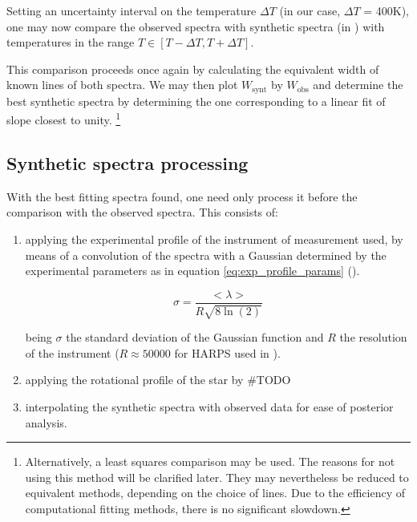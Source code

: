 \documentclass{aa}
\begin{document}
Setting an uncertainty interval on the temperature $\Delta T$  (in our case,
$\Delta T$ = 400K), one may now compare the observed spectra with synthetic
spectra (in \cite{laverny_ambre_2012}) with temperatures in the range $T\in [T - \Delta T, T + \Delta T]$.

This comparison proceeds once again by calculating the equivalent width of known
lines of both spectra. We may then plot $W_\text{synt}$ by $W_\text{obs}$ and
determine the best synthetic spectra by determining the one
corresponding to a linear fit of slope closest to unity. \footnote{Alternatively, a least squares
  comparison may be used. The reasons for not using this method will be
  clarified later. They may nevertheless be reduced to equivalent methods,
  depending on the choice of lines. Due to the efficiency of computational
  fitting methods, there is no significant slowdown.}


\subsection{Synthetic spectra processing}

With the best fitting spectra found, one need only process it before the comparison
with the observed spectra. This consists of:

\begin{enumerate}
\item applying the experimental profile of
  the instrument of measurement used, by means of a convolution of the spectra
  with a Gaussian determined by the experimental parameters as in equation
  \ref{eq:exp_profile_params} (\cite{monteiro_sebenta_2019}).

  \begin{equation}
    \label{eq:exp_profile_params}
    \sigma = \frac{<\lambda>}{R \sqrt{8 \ln (2)}}
  \end{equation}

  being $\sigma$ the standard deviation of the Gaussian function and $R$ the
  resolution of the instrument ($R \approx 50000$ for HARPS used in \cite{tsantaki_deriving_2013}).

\item applying the rotational profile of the star by \#TODO
\item interpolating the synthetic spectra with observed data for ease of
  posterior analysis. 
\end{enumerate}



\end{document}
